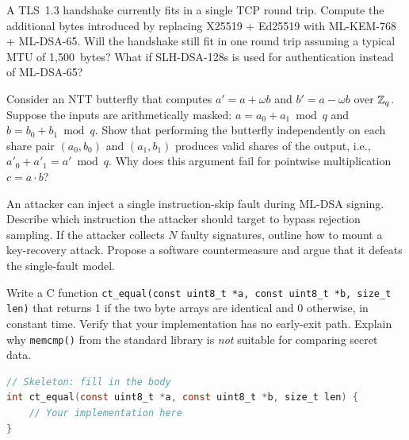 \begin{prob}
\label{prob:ch12-bandwidth}
A TLS~1.3 handshake currently fits in a single TCP round trip.  Compute the additional bytes introduced by replacing X25519 + Ed25519 with ML-KEM-768 + ML-DSA-65.  Will the handshake still fit in one round trip assuming a typical MTU of 1{,}500~bytes?  What if SLH-DSA-128s is used for authentication instead of ML-DSA-65?
\end{prob}

\begin{prob}
\label{prob:ch12-masking}
Consider an NTT butterfly that computes $a' = a + \omega b$ and $b' = a - \omega b$ over $\mathbb{Z}_q$.  Suppose the inputs are arithmetically masked: $a = a_0 + a_1 \bmod q$ and $b = b_0 + b_1 \bmod q$.  Show that performing the butterfly independently on each share pair $(a_0, b_0)$ and $(a_1, b_1)$ produces valid shares of the output, i.e., $a'_0 + a'_1 = a' \bmod q$.  Why does this argument fail for pointwise multiplication $c = a \cdot b$?
\end{prob}

\begin{prob}
\label{prob:ch12-fault}
An attacker can inject a single instruction-skip fault during ML-DSA signing.  Describe which instruction the attacker should target to bypass rejection sampling.  If the attacker collects $N$ faulty signatures, outline how to mount a key-recovery attack.  Propose a software countermeasure and argue that it defeats the single-fault model.
\end{prob}

\begin{prob}
\label{prob:ch12-ct-verify}
Write a C function \texttt{ct\_equal(const uint8\_t *a, const uint8\_t *b, size\_t len)} that returns 1 if the two byte arrays are identical and 0 otherwise, in constant time.  Verify that your implementation has no early-exit path.  Explain why \texttt{memcmp()} from the standard library is \emph{not} suitable for comparing secret data.
\begin{lstlisting}[language=C]
// Skeleton: fill in the body
int ct_equal(const uint8_t *a, const uint8_t *b, size_t len) {
    // Your implementation here
}
\end{lstlisting}
\end{prob}
